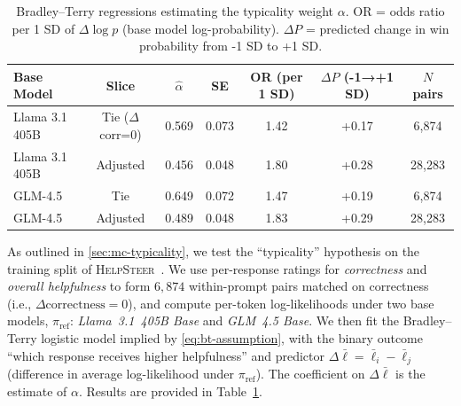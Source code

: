 



\begin{table}[h]
\centering
\small
\caption{Bradley–Terry regressions estimating the typicality weight $\alpha$. OR = odds ratio per 1 SD of $\Delta\log p$ (base model log-probability). $\Delta P$ = predicted change in win probability from -1 SD to +1 SD.}
\begin{tabular}{lcccccc}
\toprule
Base Model & Slice & $\hat\alpha$ & SE & OR (per 1 SD) & $\Delta P$ (-1→+1 SD) & $N$ pairs \\
\midrule
Llama 3.1 405B & Tie ($\Delta$corr=0) & 0.569 & 0.073 & 1.42 & +0.17 & 6{,}874 \\
Llama 3.1 405B & Adjusted             & 0.456 & 0.048 & 1.80 & +0.28 & 28{,}283 \\
GLM-4.5 & Tie                 & 0.649 & 0.072 & 1.47 & +0.19 & 6{,}874 \\
GLM-4.5 & Adjusted             & 0.489 & 0.048 & 1.83 & +0.29 & 28{,}283 \\
\bottomrule
\end{tabular}
\label{tab:mc-alpha}
\end{table}





As outlined in \cref{sec:mc-typicality}, we test the “typicality” hypothesis on the training split of \textsc{HelpSteer}~\citep{wang2024helpsteer2}. We use per-response ratings for \emph{correctness} and \emph{overall helpfulness} to form $6{,}874$ within-prompt pairs matched on correctness (i.e., $\Delta\text{correctness}=0$), and compute per-token log-likelihoods under two base models, $\pi_{\text{ref}}$: \emph{Llama~3.1~405B Base} and \emph{GLM~4.5 Base}. We then fit the Bradley–Terry logistic model implied by \eqref{eq:bt-assumption}, with the binary outcome “which response receives higher helpfulness” and predictor $\Delta\bar{\ell}=\bar{\ell}_i-\bar{\ell}_j$ (difference in average log-likelihood under $\pi_{\text{ref}}$). The coefficient on $\Delta\bar{\ell}$ is the estimate of $\alpha$. Results are provided in Table~\ref{tab:mc-alpha}.

